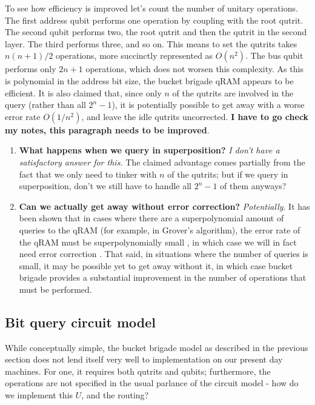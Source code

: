 \documentclass[a4paper,12pt]{article}
\begin{document}
To see how efficiency is improved let's count the number of unitary operations.
The first address qubit performs one operation by coupling with the root qutrit.
The second qubit performs two, the root qutrit and then the qutrit in the second layer. The third performs three, and so on.
This means to set the qutrits takes $n(n+1)/2$ operations, more succinctly represented as $O(n^2)$. 
The bus qubit performs only $2n + 1$ operations, which does not worsen this complexity. 
As this is polynomial in the address bit size, the bucket brigade qRAM appears to be efficient. 
It is also claimed that, since only $n$ of the qutrits are involved in the query (rather than all $2^n-1$), it is potentially possible to get away with a worse error rate $O(1/n^2)$, and leave the idle qutrits uncorrected. 
\textbf{I have to go check my notes, this paragraph needs to be improved}.

\begin{enumerate} 
 \item \textbf{What happens when we query in superposition?} 
  \emph{I don't have a satisfactory answer for this.} 
  The claimed advantage comes partially from the fact that we only need to tinker with $n$ of the qutrits; but if we query in superposition, don't we still have to handle all $2^n - 1$ of them anyways?
 \item \textbf{Can we actually get away without error correction?} \emph{Potentially}. 
 It has been shown that in cases where there are a superpolynomial amount of queries to the qRAM (for example, in Grover's algorithm), the error rate of the qRAM must be superpolynomially small \cite{Regev2008}, in which case we will in fact need error correction \cite{Arunachalam2015}. 
 That said, in situations where the number of queries is small, it may be possible yet to get away without it, in which case bucket brigade provides a substantial improvement in the number of operations that must be performed.
\end{enumerate}



\subsection{Bit query circuit model}

While conceptually simple, the bucket brigade model as described in the previous section does not lend itself very well to implementation on our present day machines. 
For one, it requires both qutrits and qubits; furthermore, the operations are not specified in the usual parlance of the circuit model - how do we implement this $U$, and the routing?
\end{document}
